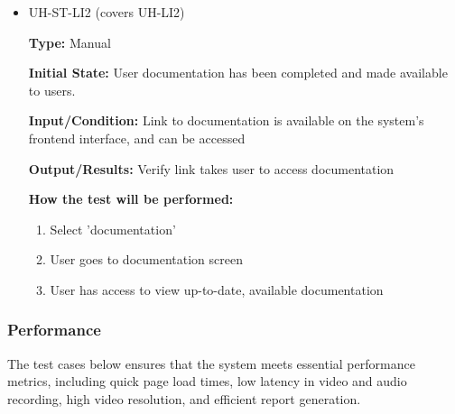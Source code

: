 \documentclass[12pt, titlepage]{article}
\begin{document}
\begin{itemize}
\begin{mdframed}[linewidth=0.5mm]
\begin{enumerate}[noitemsep]
      \end{enumerate}
  \end{mdframed}
  \item UH-ST-LI2 (covers UH-LI2)
  \begin{mdframed}[linewidth=0.5mm]
      \textbf{Type:} Manual \par
      \textbf{Initial State:} User documentation has been completed and made available to users. \par
      \textbf{Input/Condition:} Link to documentation is available on the system's frontend interface, and can be accessed\par
      \textbf{Output/Results:} Verify link takes user to access documentation \par
      \textbf{How the test will be performed:}
      \begin{enumerate}[noitemsep]
        \item Select 'documentation'
        \item User goes to documentation screen
        \item User has access to view up-to-date, available documentation
      \end{enumerate}
  \end{mdframed}
\end{itemize}

\subsubsection{Performance}
\hspace{2em}The test cases below ensures that the system meets essential performance metrics, 
including quick page load times, low latency in video and audio recording, high video 
resolution, and efficient report generation. 
\end{document}
